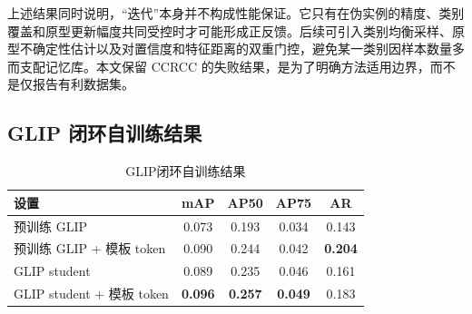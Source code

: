 \begin{table}[htbp]
\centering
\caption{框特征模板迭代结果}
\label{tab:attrip_box_token}
\end{table}

上述结果同时说明，“迭代”本身并不构成性能保证。它只有在伪实例的精度、类别覆盖和原型更新幅度共同受控时才可能形成正反馈。后续可引入类别均衡采样、原型不确定性估计以及对置信度和特征距离的双重门控，避免某一类别因样本数量多而支配记忆库。本文保留 CCRCC 的失败结果，是为了明确方法适用边界，而不是仅报告有利数据集。

\subsection{GLIP 闭环自训练结果}
\begin{table}[htbp]
\centering
\caption{GLIP闭环自训练结果}
\label{tab:attrip_glip_student}
\begin{tabular}{lcccc}
\toprule[1.5pt]
\textbf{设置} & \textbf{mAP} & \textbf{AP50} & \textbf{AP75} & \textbf{AR} \\ \midrule[1.2pt]
预训练 GLIP & 0.073 & 0.193 & 0.034 & 0.143 \\
预训练 GLIP + 模板 token & 0.090 & 0.244 & 0.042 & \textbf{0.204} \\
GLIP student & 0.089 & 0.235 & 0.046 & 0.161 \\
GLIP student + 模板 token & \textbf{0.096} & \textbf{0.257} & \textbf{0.049} & 0.183 \\ \bottomrule[1.5pt]
\end{tabular}
\end{table}

